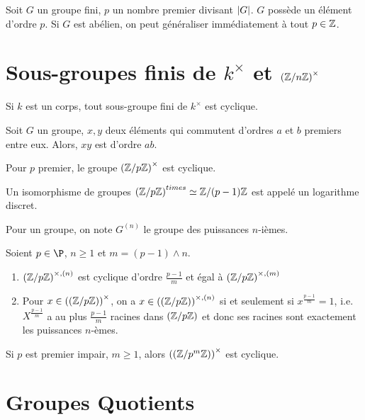 \documentclass{cours}
\newcommand*{\znz}[1]{\left(\Z/ #1\Z\right)}
\begin{document}
\begin{theorem}[Cauchy]
    Soit $G$ un groupe fini, $p$ un nombre premier divisant $\left|G\right|$. $G$ possède un élément d'ordre $p$. Si $G$ est abélien, on peut généraliser immédiatement à tout $p \in \mathbb{Z}$.
\end{theorem}

\section{Sous-groupes finis de $k^{\times}$ et $\left(\mathbb{Z}/n\mathbb{Z}\right)^{\times}$}
\begin{theorem}
    Si $k$ est un corps, tout sous-groupe fini de $k^{\times}$ est cyclique.
\end{theorem}
\begin{lemma}[Cauchy]
    Soit $G$ un groupe, $x, y$ deux éléments qui commutent d'ordres $a$ et $b$ premiers entre eux. Alors, $xy$ est d'ordre $ab$. 
\end{lemma}
\begin{theorem}[Gauss]
    Pour $p$ premier, le groupe $\left(\mathbb{Z}/p\mathbb{Z}\right)^{\times}$ est cyclique.
\end{theorem}
\begin{definition}
    Un isomorphisme de groupes $\left(\mathbb{Z}/p\mathbb{Z}\right)^{times} \simeq \mathbb{Z}/(p-1)\mathbb{Z}$ est appelé un logarithme discret.
\end{definition}
\begin{definition}
    Pour un groupe, on note $G^{(n)}$ le groupe des puissances $n$-ièmes.
\end{definition}
\begin{proposition}
    Soient $p\in\P$, $n\geq 1$ et $m = (p-1)\wedge n$.
    \begin{enumerate}
        \item $\left(\mathbb{Z}/p\mathbb{Z}\right)^{\times, (n)}$ est cyclique d'ordre $\frac{p - 1}{m}$ et égal à $\left(\mathbb{Z}/p\mathbb{Z}\right)^{\times, (m)}$
        \item Pour $x \in \left(\znz{p}\right)^{\times}$, on a $x \in \left(\znz{p}\right)^{\times, (n)}$ si et seulement si $x^{\frac{p-1}{m}} = 1$, i.e. $X^{\frac{p-1}{m}}$ a au plus $\frac{p-1}{m}$ racines dans $\znz{p}$ et donc ses racines sont exactement les puissances $n$-èmes.
    \end{enumerate}
\end{proposition}

\begin{proposition}
    Si $p$ est premier impair, $m \geq 1$, alors $\left(\znz{p^{m}}\right)^{\times}$ est cyclique. 
\end{proposition}

\section{Groupes Quotients}
\end{document}
